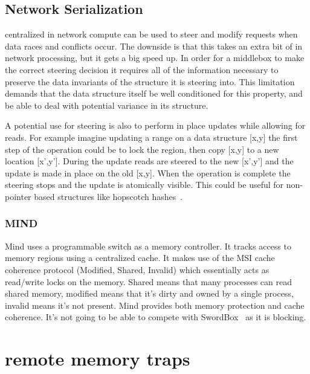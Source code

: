 \subsection{Network Serialization} 
\label{sec:net_ser}
%
centralized in network compute can be used to steer and modify
requests when data races and conflicts occur. The downside is that this takes an
extra bit of in network processing, but it gets a big speed up. In order for a
middlebox to make the correct steering decision it requires all of the
information necessary to preserve the data invariants of the structure it is
steering into. This limitation demands that the data structure itself be well
conditioned for this property, and be able to deal with potential variance in
its structure.

A potential use for steering is also to perform in place updates while allowing
for reads. For example imagine updating a range on a data structure [x,y] the
first step of the operation could be to lock the region, then copy [x,y] to a
new location [x',y']. During the update reads are steered to the new [x',y'] and
the update is made in place on the old [x,y]. When the operation is complete the
steering stops and the update is atomically visible. This could be useful for
non-pointer based structures like hopscotch hashes~\cite{hopscotch}.



\subsubsection{MIND~\cite{mind}}

Mind uses a programmable switch as a memory controller. It tracks access to
memory regions using a centralized cache. It makes use of the MSI cache
coherence protocol (Modified, Shared, Invalid) which essentially acts as
read/write locks on the memory. Shared means that many processes can read shared
memory, modified means that it's dirty and owned by a single process, invalid
means it's not present. Mind provides both memory protection and cache
coherence. It's not going to be able to compete with
SwordBox~\cite{Grant2021InContRes} as it is blocking.

\section{remote memory traps}


